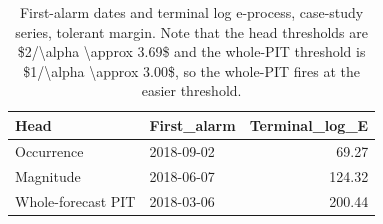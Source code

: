 \begin{table}

\caption{First-alarm dates and terminal log e-process, case-study series, tolerant margin. Note that the head thresholds are \$2/\textbackslash{}alpha \textbackslash{}approx 3.69\$ and the whole-PIT threshold is \$1/\textbackslash{}alpha \textbackslash{}approx 3.00\$, so the whole-PIT fires at the easier threshold.}
\centering
\begin{tabular}[t]{llr}
\toprule
Head & First\_alarm & Terminal\_log\_E\\
\midrule
Occurrence & 2018-09-02 & 69.27\\
Magnitude & 2018-06-07 & 124.32\\
Whole-forecast PIT & 2018-03-06 & 200.44\\
\bottomrule
\end{tabular}
\end{table}

